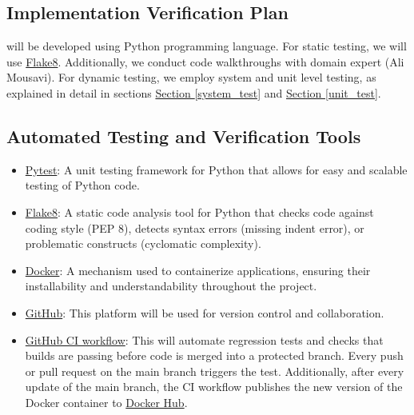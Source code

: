 \documentclass[12pt, titlepage]{article}
\begin{document}



\subsection{Implementation Verification Plan}
\progname{} will be developed using Python programming language.
For static testing, we will use \href{https://flake8.pycqa.org/}{Flake8}.
Additionally, we conduct code
walkthroughs with domain expert (Ali Mousavi). For dynamic testing,
we employ system and unit level testing, as explained
in detail in sections
\hyperref[system_test]{Section \ref*{system_test}}
and \hyperref[unit_test]{Section \ref*{unit_test}}.



\subsection{Automated Testing and Verification Tools}

\begin{itemize}
  \item \href{https://docs.pytest.org/}{Pytest}: A unit testing framework for Python that allows
        for easy and scalable testing of Python code.
  \item \href{https://flake8.pycqa.org/}{Flake8}: A static code analysis tool for
        Python that checks code against coding style (PEP 8), detects syntax errors (missing indent error),
        or problematic constructs (cyclomatic complexity).
  \item \href{https://www.docker.com/}{Docker}: A mechanism used to containerize applications,
        ensuring their installability and understandability throughout the project.
  \item \href{https://github.com/}{GitHub}: This platform will be used for
        version control and collaboration.
  \item \href{https://docs.github.com/en/actions}{GitHub CI workflow}: This will
        automate regression tests and checks that \progname{} builds are passing before
        code is merged into a protected branch. Every push or pull request on the
        main branch triggers the test. Additionally, after every update of
        the main branch, the CI workflow publishes the new version of
        the Docker container to \href{https://hub.docker.com/}{Docker Hub}.

\end{itemize}
\end{document}
